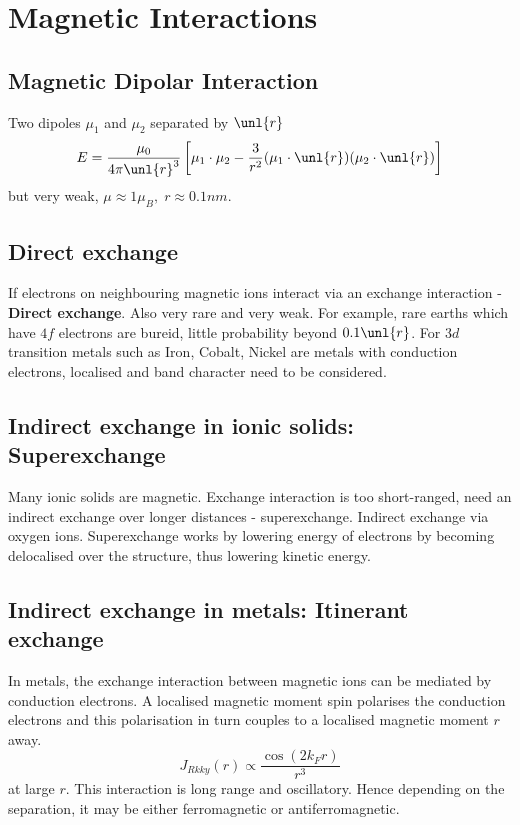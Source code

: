\documentclass[a4paper, 11pt, normalem]{report}
\begin{document}
\section{Magnetic Interactions}
\subsection{Magnetic Dipolar Interaction}
Two dipoles $\mu_1$ and $\mu_2$ separated by $\unl{r}$
\begin{equation}
    E = \frac{\mu_0}{4\pi\unl{r}^3}\left[\mu_1\cdot\mu_2 - \frac{3}{r^2}(\mu_1\cdot\unl{r})(\mu_2\cdot\unl{r})\right]
\end{equation}
but very weak, $\mu\approx1\mu_B,\; r\approx0.1nm$.

\subsection{Direct exchange}
If electrons on neighbouring magnetic ions interact via an exchange interaction - \textbf{Direct exchange}.
Also very rare and very weak.
For example, rare earths which have $4f$ electrons are bureid, little probability beyond $0.1\unl{r}$.
For $3d$ transition metals such as Iron, Cobalt, Nickel are metals with conduction electrons, localised and band character need to be considered. 

\subsection{Indirect exchange in ionic solids: Superexchange}
Many ionic solids are magnetic. 
Exchange interaction is too short-ranged, need an indirect exchange over longer distances - superexchange. 
Indirect exchange via oxygen ions.
Superexchange works by lowering energy of electrons by becoming delocalised over the structure, thus lowering kinetic energy.

\subsection{Indirect exchange in metals: Itinerant exchange}
In metals, the exchange interaction between magnetic ions can be mediated by conduction electrons. 
A localised magnetic moment spin polarises the conduction electrons and this polarisation in turn couples to a localised magnetic moment $r$ away. 
\begin{equation}
    J_{Rkky}(r) \propto \frac{\cos(2k_Fr)}{r^3}
\end{equation}
at large $r$.
This interaction is long range and oscillatory. 
Hence depending on the separation, it may be either ferromagnetic or antiferromagnetic.
\end{document}

